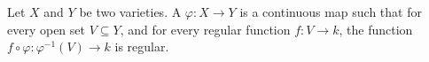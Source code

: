 Let $X$ and $Y$ be two varieties. A  $\varphi: X \to Y$ is a continuous map such that for every open set $V \subseteq Y$, and for every regular function $f: V \to k$, the function $f \circ \varphi: \varphi^{-1}(V) \to k$ is regular.
